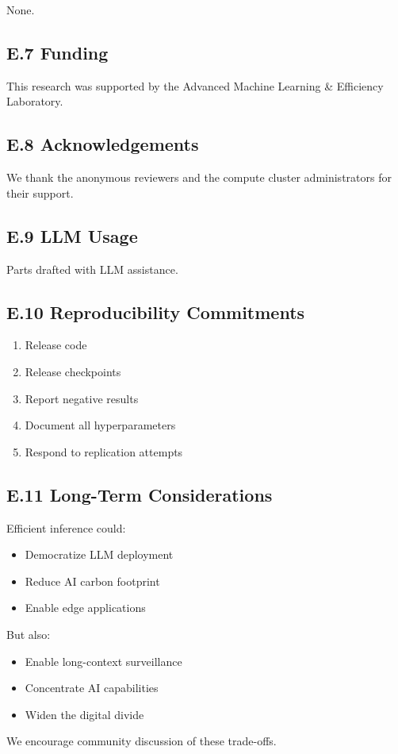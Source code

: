 None.

\subsection{E.7 Funding}

This research was supported by the Advanced Machine Learning \& Efficiency Laboratory.

\subsection{E.8 Acknowledgements}

We thank the anonymous reviewers and the compute cluster administrators for their support.

\subsection{E.9 LLM Usage}

Parts drafted with LLM assistance.

\subsection{E.10 Reproducibility Commitments}

\begin{enumerate}
\item Release code
\item Release checkpoints
\item Report negative results
\item Document all hyperparameters
\item Respond to replication attempts

\end{enumerate}
\subsection{E.11 Long-Term Considerations}

Efficient inference could:

\begin{itemize}
\item Democratize LLM deployment
\item Reduce AI carbon footprint
\item Enable edge applications

\end{itemize}
But also:

\begin{itemize}
\item Enable long-context surveillance
\item Concentrate AI capabilities
\item Widen the digital divide

\end{itemize}
We encourage community discussion of these trade-offs.